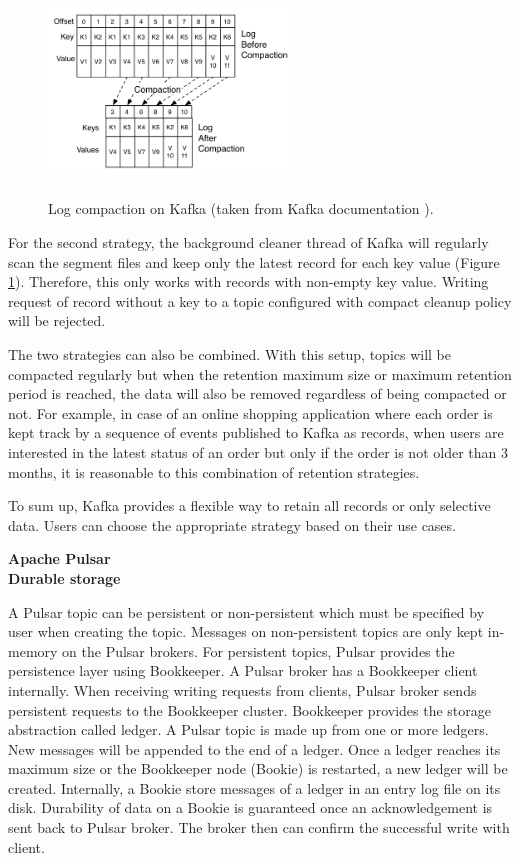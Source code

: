 \begin{figure}[h]
	\centering
	\includegraphics[width=6.5cm,height=5.5cm]{images/compact-kafka.png}
	\caption{Log compaction on Kafka (taken from Kafka documentation \cite{kafkadesignlogcompact}).}
	\label{fig:compactekafka}
\end{figure}
For the second strategy, the background cleaner thread of Kafka will regularly scan the segment files and keep only the latest record for each key value (Figure \ref{fig:compactekafka}). Therefore, this only works with records with non-empty key value. Writing request of record without a key to a topic configured with compact cleanup policy will be rejected.


The two strategies can also be combined. With this setup, topics will be compacted regularly but when the retention maximum size or maximum retention period is reached, the data will also be removed regardless of being compacted or not. For example, in case of an online shopping application where each order is kept track by a sequence of events published to Kafka as records, when users are interested in the latest status of an order but only if the order is not older than 3 months, it is reasonable to this combination of retention strategies.

To sum up, Kafka provides a flexible way to retain all records or only selective data. Users can choose the appropriate strategy based on their use cases. 

\large \textbf{Apache Pulsar}\\
\normalsize
\textbf{Durable storage}

A Pulsar topic can be persistent or non-persistent which must be specified by user when creating the topic. Messages on non-persistent topics are only kept in-memory on the Pulsar brokers. For persistent topics, Pulsar provides the persistence layer using Bookkeeper.  A Pulsar broker has a Bookkeeper client internally. When receiving writing requests from clients, Pulsar broker sends persistent requests to the Bookkeeper cluster. Bookkeeper provides the storage abstraction called ledger. A Pulsar topic is made up from one or more ledgers. New messages will be appended to the end of a ledger. Once a ledger reaches its maximum size or the Bookkeeper node (Bookie) is restarted, a new ledger will be created. Internally, a Bookie store messages of a ledger in an entry log file on its disk. Durability of data on a Bookie is guaranteed once an acknowledgement is sent back to Pulsar broker. The broker then can confirm the successful write with client.

